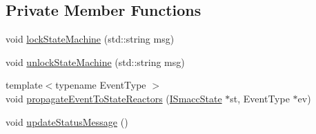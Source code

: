 \subsection*{Private Member Functions}
\begin{DoxyCompactItemize}
\item 
void \hyperlink{classsmacc_1_1ISmaccStateMachine_a5c8d4c9a4b11c7950266a00e48080ce3}{lock\+State\+Machine} (std\+::string msg)
\item 
void \hyperlink{classsmacc_1_1ISmaccStateMachine_ae2e3ceb87bfe3f9d8bf320e36071fdc7}{unlock\+State\+Machine} (std\+::string msg)
\item 
{\footnotesize template$<$typename Event\+Type $>$ }\\void \hyperlink{classsmacc_1_1ISmaccStateMachine_a3d369c7cff22632ca85a8656000ba19c}{propagate\+Event\+To\+State\+Reactors} (\hyperlink{classsmacc_1_1ISmaccState}{I\+Smacc\+State} $\ast$st, Event\+Type $\ast$ev)
\item 
void \hyperlink{classsmacc_1_1ISmaccStateMachine_ad246a49015fadaeb0b1639d7ab99f7d0}{update\+Status\+Message} ()
\end{DoxyCompactItemize}
